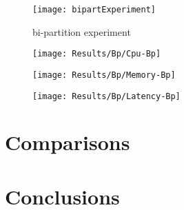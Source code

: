 \begin{figure}[htbp]
    \centering
    \texttt{[image: bipartExperiment]}
    \caption{bi-partition experiment}
    \label{fig:gantt}
\end{figure}

\begin{figure}[htbp]
    \centering
    \texttt{[image: Results/Bp/Cpu-Bp]}
    \label{fig:gantt}
\end{figure}

\begin{figure}[htbp]
    \centering
    \texttt{[image: Results/Bp/Memory-Bp]}
    \label{fig:gantt}
\end{figure}

\begin{figure}[htbp]
    \centering
    \texttt{[image: Results/Bp/Latency-Bp]}
    \label{fig:gantt}
\end{figure}

\section{Comparisons} %
\label{sec:comparisons}

\section{Conclusions} %
\label{sec:conclusions}